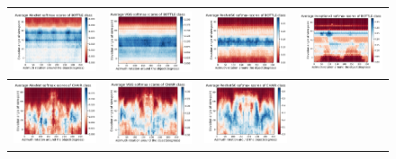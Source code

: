 \begin{figure}[h]
\begin{tabular}{||c|c|c|c||}
\includegraphics[width = 4cm]{supimages/nms2d/AlexNet_bottle_Average.pdf}&
\includegraphics[width = 4cm]{supimages/nms2d/VGG_bottle_Average.pdf}&
\includegraphics[width = 4cm]{supimages/nms2d/ResNet50_bottle_Average.pdf}&
\includegraphics[width = 4cm]{supimages/nms2d/Inceptionv3_bottle_Average.pdf} \\\hline
\includegraphics[width = 4cm]{supimages/nms2d/AlexNet_chair_Average.pdf}&
\includegraphics[width = 4cm]{supimages/nms2d/VGG_chair_Average.pdf}&
\includegraphics[width = 4cm]{supimages/nms2d/ResNet50_chair_Average.pdf}&

\end{tabular}
\end{figure}
